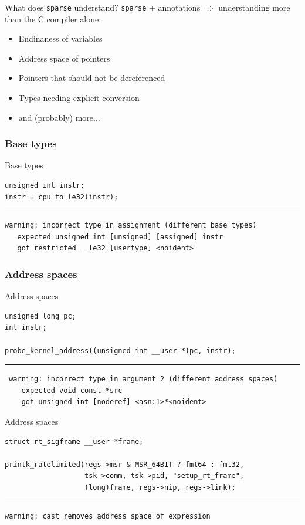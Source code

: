 \documentclass[pdf,aspectratio=169]{beamer}
\begin{document}
\begin{frame}{What does \texttt{sparse} understand?}
\texttt{sparse} + annotations $\Rightarrow$ understanding more than the C compiler alone:
  \begin{itemize}
  \item Endinaness of variables
  \item Address space of pointers
  \item Pointers that should not be dereferenced
  \item Types needing explicit conversion
  \item and (probably) more...
  \end{itemize}
\end{frame}

\subsubsection{Base types}
\label{sec-2-2-1}
\begin{frame}[fragile]{Base types}
\begin{verbatim}
unsigned int instr;
instr = cpu_to_le32(instr);
\end{verbatim}
\pause
\hrule
\begin{verbatim}
warning: incorrect type in assignment (different base types)
   expected unsigned int [unsigned] [assigned] instr
   got restricted __le32 [usertype] <noident>
\end{verbatim}
\end{frame}

\subsubsection{Address spaces}
\label{sec-2-2-2}

\begin{frame}[fragile]{Address spaces}
\begin{verbatim}
unsigned long pc;
int instr;

probe_kernel_address((unsigned int __user *)pc, instr);
\end{verbatim}
\pause
\hrule
\begin{verbatim}
 warning: incorrect type in argument 2 (different address spaces)
    expected void const *src
    got unsigned int [noderef] <asn:1>*<noident>
\end{verbatim}
\end{frame}

\begin{frame}[fragile]{Address spaces}
\begin{verbatim}
struct rt_sigframe __user *frame;

printk_ratelimited(regs->msr & MSR_64BIT ? fmt64 : fmt32,
                   tsk->comm, tsk->pid, "setup_rt_frame",
                   (long)frame, regs->nip, regs->link);
\end{verbatim}
\pause
\hrule
\begin{verbatim}
warning: cast removes address space of expression
\end{verbatim}
\end{frame}
\end{document}

